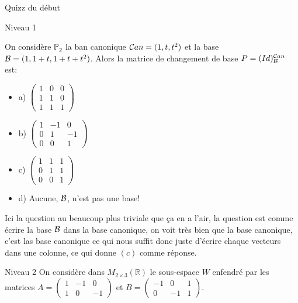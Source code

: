 
\begin{parag}{Quizz du début}
\begin{subparag}{Niveau 1}
    

    On considère $\mathbb{P_2}$ la ban canonique $\mathcal{C} an = (1, t, t^2)$ et la base $\mathcal{B} = (1, 1 + t, 1 + t + t^2)$. Alors la matrice de changement de base $P = (Id)_{\mathcal{B}}^{\mathcal{C} an}$ est:
    \begin{itemize}
        \item a) $\begin{pmatrix}
            1 & 0 & 0\\
            1 & 1 & 0\\
            1 & 1 & 1
        \end{pmatrix}$
        \item b) $\begin{pmatrix}
            1 & -1 & 0 \\
            0 & 1 & -1\\
            0 & 0 & 1
        \end{pmatrix}$
        \item c) $\begin{pmatrix}
            1 & 1 & 1 \\
            0 & 1 & 1 \\
            0 & 0 & 1
        \end{pmatrix}$
        \item d) Aucune, $\mathcal{B}$, n'est pas une base!
    \end{itemize}
    Ici la question au beaucoup plus triviale que ça en a l'air, la question est comme écrire la base $\mathcal{B}$ dans la base canonique, on voit très bien que la base canonique, c'est las base canonique ce qui nous suffit donc juste d'écrire chaque vecteurs dans une colonne, ce qui donne $(c)$ comme réponse.
    \end{subparag}
    \begin{subparag}{Niveau 2}
        On considère dans $M_{2\times 3}(\mathbb{R})$ le sous-espace $W$ enfendré par les matrices $A = \begin{pmatrix}
            1 & -1 & 0\\
            1 & 0 & -1
        \end{pmatrix}$ et $B = \begin{pmatrix}
            -1 & 0 & 1\\
            0 & -1 & 1
        \end{pmatrix}$.

\end{subparag}
\end{parag}
